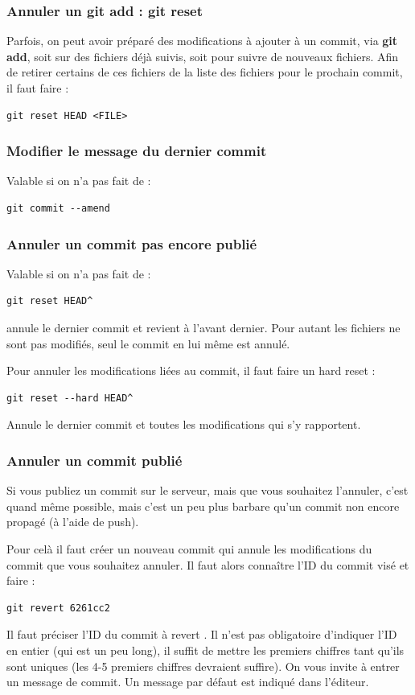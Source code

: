 \documentclass[a4paper,twoside]{article}
\begin{document}
\subsubsection{Annuler un git add : git reset}
Parfois, on peut avoir préparé des modifications à ajouter à un commit, via \textbf{git add}, soit sur des fichiers déjà suivis, soit pour suivre de nouveaux fichiers. Afin de retirer certains de ces fichiers de la liste des fichiers pour le prochain commit, il faut faire :
\begin{verbatim}
git reset HEAD <FILE>
\end{verbatim}

\subsubsection{Modifier le message du dernier commit}
Valable si on n'a pas fait de  :
\begin{verbatim}
git commit --amend
\end{verbatim}

\subsubsection{Annuler un commit pas encore publié}
Valable si on n'a pas fait de  :
\begin{verbatim}
git reset HEAD^
\end{verbatim}
annule le dernier commit et revient à l'avant dernier. Pour autant les fichiers ne sont pas modifiés, seul le commit en lui même est annulé.

\bigskip

Pour annuler les modifications liées au commit, il faut faire un hard reset :
\begin{verbatim}
git reset --hard HEAD^
\end{verbatim}
Annule le dernier commit et toutes les modifications qui s'y rapportent. 

\subsubsection{Annuler un commit publié}
Si vous publiez un commit sur le serveur, mais que vous souhaitez l'annuler, c'est quand même possible, mais c'est un peu plus barbare qu'un commit non encore propagé (à l'aide de push). 

Pour celà il faut créer un nouveau commit qui annule les modifications du commit que vous souhaitez annuler. Il faut alors connaître l'ID du commit visé et faire : 
\begin{verbatim}
git revert 6261cc2
\end{verbatim}
Il faut préciser l'ID du commit à \og revert \fg. Il n'est pas obligatoire d'indiquer l'ID en entier (qui est un peu long), il suffit de mettre les premiers chiffres tant qu'ils sont uniques (les 4-5 premiers chiffres devraient suffire). On vous invite à entrer un message de commit. Un message par défaut est indiqué dans l'éditeur.
\end{document}

